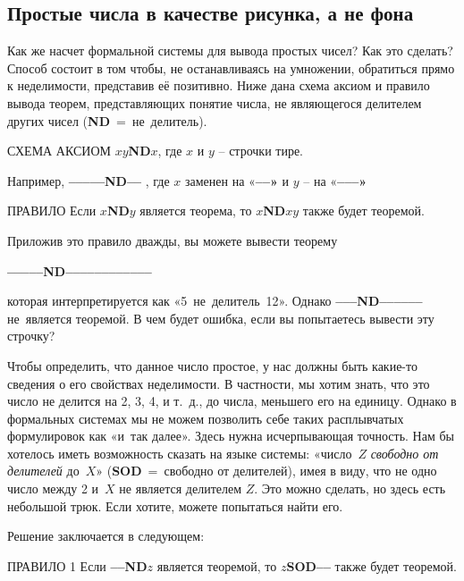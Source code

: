 \documentclass[../main.tex]{subfiles}
\begin{document}
\subsection{Простые числа в качестве рисунка, а не фона}

Как же насчет формальной системы для вывода простых чисел?
Как это сделать?
Способ состоит в том чтобы, не останавливаясь на умножении, обратиться прямо к неделимости, представив её позитивно.
Ниже дана схема аксиом и правило вывода теорем, представляющих понятие числа, не являющегося делителем других чисел (\textbf{ND}~=~не~делитель).

\begin{mybox}{СХЕМА АКСИОМ}
    \textbf{$xy$ND$x$}, где $x$ и $y$ \--- строчки тире.
\end{mybox}

Например, \textbf{--{}--{}--{}--{}--ND--{}--} , где $x$ заменен на «\textbf{--{}--»} и $y$ \--- на «\textbf{--{}--{}--»}

\begin{mybox}{ПРАВИЛО}
    Если \textbf{$x$ND$y$} является теорема, то \textbf{$x$ND$xy$} также будет теоремой.
\end{mybox}

Приложив это правило дважды, вы можете вывести теорему
%
\begin{center}
    \textbf{--{}--{}--{}--{}--ND--{}--{}--{}--{}--{}--{}--{}--{}--{}--{}--{}--}
\end{center}
%
которая интерпретируется как «5~не~делитель~12».
Однако \textbf{--{}--{}--ND--{}--{}--{}--{}--{}--} не~является теоремой.
В чем будет ошибка, если вы попытаетесь вывести эту строчку?

Чтобы определить, что данное число простое, у нас должны быть какие-то сведения о его свойствах неделимости.
В частности, мы хотим знать, что это число не делится на 2, 3, 4, и т.~д., до числа, меньшего его на единицу.
Однако в формальных системах мы не можем позволить себе таких расплывчатых формулировок как «и~так далее».
Здесь нужна исчерпывающая точность.
Нам бы хотелось иметь возможность сказать на языке системы: «число~$Z$ \emph{свободно от делителей} до~$X$» (\textbf{SOD}~=~свободно от делителей), имея в виду, что не одно число между 2 и~$X$ не является делителем $Z$.
Это можно сделать, но здесь есть небольшой трюк.
Если хотите, можете попытаться найти его.

Решение заключается в следующем:

\begin{mybox}{ПРАВИЛО 1}
    Если \textbf{--{}--ND$z$} является теоремой, то \textbf{$z$SOD--{}--} также будет теоремой.
\end{mybox}
\end{document}
